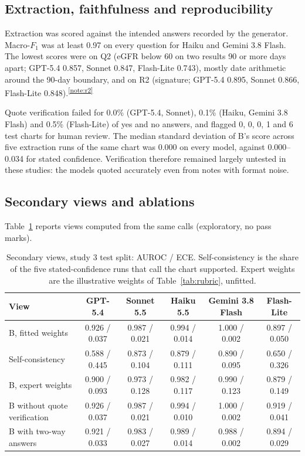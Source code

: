 \documentclass[10pt,letterpaper]{article}
\newcommand{\tnote}[1]{\textsuperscript{\hyperref[note:#1]{\ref*{note:#1}}}}
\begin{document}
\FloatBarrier
\subsection{Extraction, faithfulness and reproducibility}

Extraction was scored against the intended answers recorded by the generator. Macro-$F_1$ was at least 0.97 on every question for Haiku and Gemini 3.8 Flash. The lowest scores were on Q2 (eGFR below 60 on two results 90 or more days apart; GPT-5.4 0.857, Sonnet 0.847, Flash-Lite 0.743), mostly date arithmetic around the 90-day boundary, and on R2 (signature; GPT-5.4 0.895, Sonnet 0.866, Flash-Lite 0.848).\tnote{r2}

Quote verification failed for 0.0\% (GPT-5.4, Sonnet), 0.1\% (Haiku, Gemini 3.8 Flash) and 0.5\% (Flash-Lite) of yes and no answers, and flagged 0, 0, 0, 1 and 6 test charts for human review. The median standard deviation of B's score across five extraction runs of the same chart was 0.000 on every model, against 0.000--0.034 for stated confidence. Verification therefore remained largely untested in these studies: the models quoted accurately even from notes with format noise.

\FloatBarrier
\subsection{Secondary views and ablations}\label{sec:results-weights}

Table~\ref{tab:ablations} reports views computed from the same calls (exploratory, no pass marks).

\begin{table}[!htbp]
\centering\footnotesize\setlength{\tabcolsep}{4pt}
\caption{Secondary views, study 3 test split: AUROC / ECE. Self-consistency is the share of the five stated-confidence runs that call the chart supported. Expert weights are the illustrative weights of Table~\ref{tab:rubric}, unfitted.}\label{tab:ablations}
\begin{tabular}{@{}lccccc@{}}
\toprule
View & GPT-5.4 & Sonnet 5.5 & Haiku 5.5 & Gemini 3.8 Flash & Flash-Lite \\
\midrule
B, fitted weights & 0.926 / 0.037 & 0.987 / 0.021 & 0.994 / 0.014 & 1.000 / 0.002 & 0.897 / 0.050 \\
Self-consistency & 0.588 / 0.445 & 0.873 / 0.104 & 0.879 / 0.111 & 0.890 / 0.095 & 0.650 / 0.326 \\
B, expert weights & 0.900 / 0.093 & 0.973 / 0.128 & 0.982 / 0.117 & 0.990 / 0.123 & 0.879 / 0.149 \\
B without quote verification & 0.926 / 0.037 & 0.987 / 0.021 & 0.994 / 0.010 & 1.000 / 0.002 & 0.919 / 0.041 \\
B with two-way answers & 0.921 / 0.033 & 0.983 / 0.027 & 0.989 / 0.014 & 0.988 / 0.002 & 0.894 / 0.029 \\
\bottomrule
\end{tabular}
\end{table}
\end{document}
